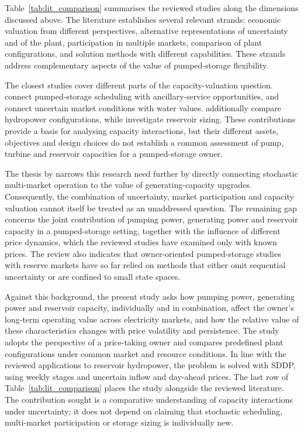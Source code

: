 Table~\ref{tab:lit_comparison} summarises the reviewed studies along the
dimensions discussed above. The literature establishes several relevant
strands: economic valuation from different perspectives, alternative
representations of uncertainty and of the plant, participation in
multiple markets, comparison of plant configurations, and solution
methods with different capabilities. These strands address
complementary aspects of the value of pumped-storage flexibility.

The closest studies cover different parts of the capacity-valuation
question. \citet{abgottspon2014} connect pumped-storage scheduling with
ancillary-service opportunities, and \citet{helseth2016} connect
uncertain market conditions with water values. \citet{helseth2017iet}
additionally compare hydropower configurations, while
\citet{zisos2023mixing} investigate reservoir sizing. These
contributions provide a basis for analysing capacity interactions, but
their different assets, objectives and design choices do not establish
a common assessment of pump, turbine and reservoir capacities for a
pumped-storage owner.

The thesis by \citet{bore2026assessing} narrows this research need
further by directly connecting stochastic multi-market operation to the
value of generating-capacity upgrades. Consequently, the combination of
uncertainty, market participation and capacity valuation cannot itself
be treated as an unaddressed question. The remaining gap concerns the
joint contribution of pumping power, generating power and reservoir
capacity in a pumped-storage setting, together with the influence of
different price dynamics, which the reviewed studies have examined only
with known prices. The review also indicates that owner-oriented
pumped-storage studies with reserve markets have so far relied on
methods that either omit sequential uncertainty or are confined to small
state spaces.

Against this background, the present study asks how pumping power,
generating power and reservoir capacity, individually and in
combination, affect the owner's long-term operating value across
electricity markets, and how the relative value of these characteristics
changes with price volatility and persistence. The study adopts the
perspective of a price-taking owner and compares predefined plant
configurations under common market and resource conditions. In line
with the reviewed applications to reservoir hydropower, the problem is
solved with SDDP, using weekly stages and uncertain inflow and day-ahead
prices. The last row of Table~\ref{tab:lit_comparison} places the study
alongside the reviewed literature. The contribution sought is a
comparative understanding of capacity interactions under uncertainty; it
does not depend on claiming that stochastic scheduling, multi-market
participation or storage sizing is individually new.

